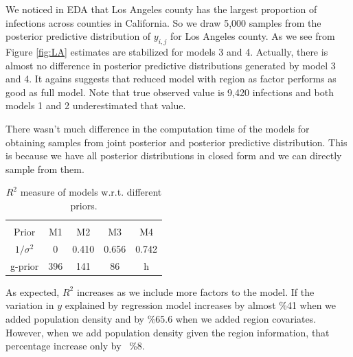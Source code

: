 \documentclass[11pt,twocolumn]{asaproc}
\begin{document}
We noticed in EDA that Los Angeles county has the largest proportion of infections across counties in California. So we draw 5,000 samples from the posterior predictive distribution of $y_{i,j}$ for Los Angeles county. As we see from Figure \ref{fig:LA} estimates are stabilized for models 3 and 4. Actually, there is almost no difference in posterior predictive distributions generated by model 3 and 4. It agains suggests that reduced model with region as factor performs as good as full model. Note that true observed value is 9,420 infections and both models 1 and 2 underestimated that value. 
 

There wasn't much difference in the computation time of the models for obtaining samples from joint posterior and posterior predictive distribution. This is because we have all posterior distributions in closed form and we can directly sample from them. 


\begin{table}
\caption{$R^2$ measure of models w.r.t. different priors.}
\label{tab:infectionss}
\begin{center}
\begin{tabular}{ccccc}
\hline
\hline
\\[-5pt]
\multicolumn{1}{c}{Prior} &
\multicolumn{1}{c}{M1} &
\multicolumn{1}{c}{M2} &
\multicolumn{1}{c}{M3} &
\multicolumn{1}{c}{M4}\\
\hline
$1/\sigma^2$ &	0&   0.410 & 0.656 & 0.742\\
g-prior &	396&   141 & 86 & h\\
\hline
\end{tabular}
\end{center}
\end{table}


As expected, $R^2$ increases as we include more factors to the model. If the variation in $y$ explained by regression model increases by almost \%41 when we added population density and by \%65.6 when we added region covariates. However, when we add population density given the region information, that percentage increase only by ~\%8. 



\end{document}
